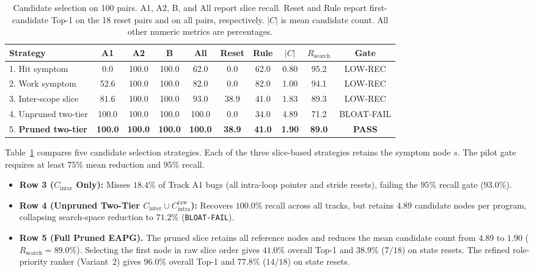 \begin{table}[t]
\centering
\small
\caption{Candidate selection on 100 pairs. A1, A2, B, and All report slice recall. Reset and Rule report first-candidate Top-1 on the 18 reset pairs and on all pairs, respectively. $|C|$ is mean candidate count. All other numeric metrics are percentages.}
\label{tab:pilot_slicing_recall}
\setlength{\tabcolsep}{4pt}
\begin{tabular}{@{}lccccccccc@{}}
\toprule
\textbf{Strategy} & \textbf{A1} & \textbf{A2} & \textbf{B} & \textbf{All} & \textbf{Reset} & \textbf{Rule} & \textbf{$|C|$} & \textbf{$R_{\text{search}}$} & \textbf{Gate} \\
\midrule
1. Hit symptom & 0.0 & 100.0 & 100.0 & 62.0 & 0.0 & 62.0 & 0.80 & 95.2 & LOW-REC \\
2. Work symptom & 52.6 & 100.0 & 100.0 & 82.0 & 0.0 & 82.0 & 1.00 & 94.1 & LOW-REC \\
3. Inter-scope slice & 81.6 & 100.0 & 100.0 & 93.0 & 38.9 & 41.0 & 1.83 & 89.3 & LOW-REC \\
4. Unpruned two-tier & 100.0 & 100.0 & 100.0 & 100.0 & 0.0 & 34.0 & 4.89 & 71.2 & BLOAT-FAIL \\
5. \textbf{Pruned two-tier} & \textbf{100.0} & \textbf{100.0} & \textbf{100.0} & \textbf{100.0} & \textbf{38.9} & \textbf{41.0} & \textbf{1.90} & \textbf{89.0} & \textbf{PASS} \\
\bottomrule
\end{tabular}
\end{table}

Table~\ref{tab:pilot_slicing_recall} compares five candidate selection strategies. Each of the three slice-based strategies retains the symptom node $s$. The pilot gate requires at least $75\%$ mean reduction and $95\%$ recall.
\begin{itemize}
    \item \textbf{Row 3 ($C_{\text{inter}}$ Only):} Misses $18.4\%$ of Track A1 bugs (all intra-loop pointer and stride resets), failing the $95\%$ recall gate ($93.0\%$).
    \item \textbf{Row 4 (Unpruned Two-Tier $C_{\text{inter}} \cup C_{\text{intra}}^{\text{raw}}$):} Recovers $100.0\%$ recall across all tracks, but retains $4.89$ candidate nodes per program, collapsing search-space reduction to $71.2\%$ (\texttt{BLOAT-FAIL}).
    \item \textbf{Row 5 (Full Pruned EAPG).} The pruned slice retains all reference nodes and reduces the mean candidate count from $4.89$ to $1.90$ ($R_{\text{search}} = 89.0\%$). Selecting the first node in raw slice order gives $41.0\%$ overall Top-1 and $38.9\%$ ($7/18$) on state resets. The refined role-priority ranker (Variant~2) gives $96.0\%$ overall Top-1 and $77.8\%$ ($14/18$) on state resets.
\end{itemize}

